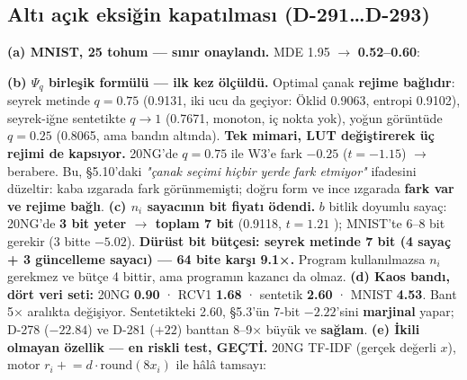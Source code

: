 \documentclass[11pt]{article}
\newenvironment{notkutu}{\def\FrameCommand{\fboxsep=6pt\colorbox{kutu}}\MakeFramed{\advance\hsize-\width\FrameRestore}\small}{\endMakeFramed}
\begin{document}
\subsection*{Altı açık eksiğin kapatılması (D-291…D-293)}
\textbf{(a) MNIST, 25 tohum — sınır onaylandı.} MDE 1.95 $\rightarrow$ \textbf{0.52–0.60}:
\begin{center}\small{}\end{center}
\textbf{(b) $\Psi_q$ birleşik formülü — ilk kez ölçüldü.} Optimal çanak \textbf{rejime bağlıdır}: seyrek metinde $q{=}0.75$ (0.9131, iki ucu da geçiyor: Öklid 0.9063, entropi 0.9102), seyrek-iğne sentetikte $q\to1$ (0.7671, monoton, iç nokta yok), yoğun görüntüde $q{=}0.25$ (0.8065, ama bandın altında). \textbf{Tek mimari, LUT değiştirerek üç rejimi de kapsıyor.} 20NG'de $q{=}0.75$ ile W3'e fark $-0.25$ ($t{=}-1.15$) $\rightarrow$ berabere.  Bu, §5.10'daki \emph{"çanak seçimi hiçbir yerde fark etmiyor"} ifadesini düzeltir: kaba ızgarada fark görünmemişti; doğru form ve ince ızgarada \textbf{fark var ve rejime bağlı}.
\textbf{(c) $n_i$ sayacının bit fiyatı ödendi.} $b$ bitlik doyumlu sayaç: 20NG'de \textbf{3 bit yeter $\rightarrow$ toplam 7 bit} (0.9118, $t{=}1.21$ ); MNIST'te 6–8 bit gerekir (3 bitte $-5.02$).
\begin{notkutu}\textbf{Dürüst bit bütçesi: seyrek metinde 7 bit (4 sayaç + 3 güncelleme sayacı) — 64 bite karşı 9.1×.} Program kullanılmazsa $n_i$ gerekmez ve bütçe 4 bittir, ama programın kazancı da olmaz.
\end{notkutu}
\textbf{(d) Kaos bandı, dört veri seti:} 20NG \textbf{0.90} · RCV1 \textbf{1.68} · sentetik \textbf{2.60} · MNIST \textbf{4.53}. Bant 5× aralıkta değişiyor. Sentetikteki 2.60, §5.3'ün 7-bit $-2.22$'sini \textbf{marjinal} yapar; D-278 ($-22.84$) ve D-281 ($+22$) banttan 8–9× büyük ve \textbf{sağlam}.
\textbf{(e) İkili olmayan özellik — en riskli test, GEÇTİ.} 20NG TF-IDF (gerçek değerli $x$), motor $r_i \mathrel{+}= d\cdot\mathrm{round}(8x_i)$ ile hâlâ tamsayı:
\end{document}
